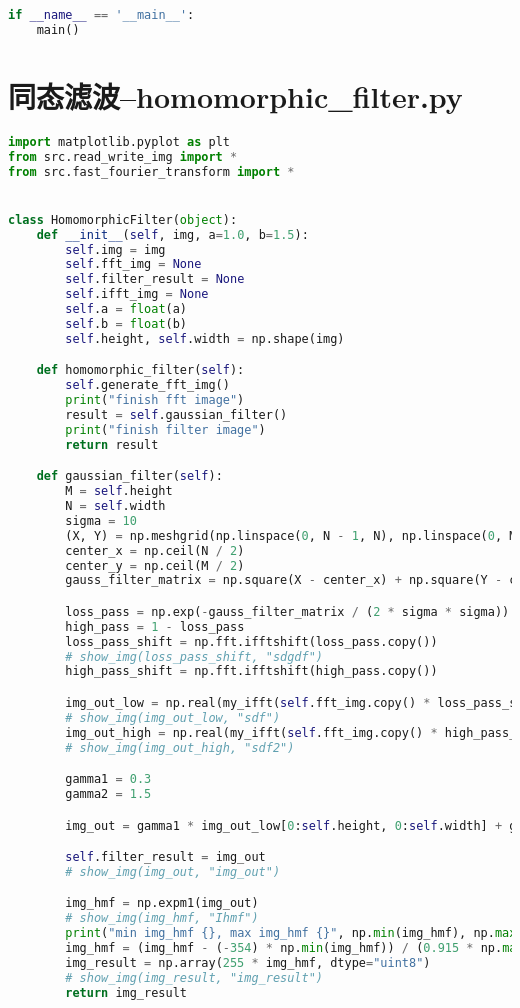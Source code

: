 \documentclass{hitreport}
\begin{document}
\begin{appendices}
\begin{lstlisting}[language=python]
if __name__ == '__main__':
    main()

\end{lstlisting}

\section{同态滤波--homomorphic\_filter.py}\label{app:homo}
\begin{lstlisting}[language=python]
import matplotlib.pyplot as plt
from src.read_write_img import *
from src.fast_fourier_transform import *


class HomomorphicFilter(object):
    def __init__(self, img, a=1.0, b=1.5):
        self.img = img
        self.fft_img = None
        self.filter_result = None
        self.ifft_img = None
        self.a = float(a)
        self.b = float(b)
        self.height, self.width = np.shape(img)

    def homomorphic_filter(self):
        self.generate_fft_img()
        print("finish fft image")
        result = self.gaussian_filter()
        print("finish filter image")
        return result

    def gaussian_filter(self):
        M = self.height
        N = self.width
        sigma = 10
        (X, Y) = np.meshgrid(np.linspace(0, N - 1, N), np.linspace(0, M - 1, M))
        center_x = np.ceil(N / 2)
        center_y = np.ceil(M / 2)
        gauss_filter_matrix = np.square(X - center_x) + np.square(Y - center_y)

        loss_pass = np.exp(-gauss_filter_matrix / (2 * sigma * sigma))
        high_pass = 1 - loss_pass
        loss_pass_shift = np.fft.ifftshift(loss_pass.copy())
        # show_img(loss_pass_shift, "sdgdf")
        high_pass_shift = np.fft.ifftshift(high_pass.copy())

        img_out_low = np.real(my_ifft(self.fft_img.copy() * loss_pass_shift))
        # show_img(img_out_low, "sdf")
        img_out_high = np.real(my_ifft(self.fft_img.copy() * high_pass_shift))
        # show_img(img_out_high, "sdf2")

        gamma1 = 0.3
        gamma2 = 1.5

        img_out = gamma1 * img_out_low[0:self.height, 0:self.width] + gamma2 * img_out_high[0:self.height, 0:self.width]

        self.filter_result = img_out
        # show_img(img_out, "img_out")

        img_hmf = np.expm1(img_out)
        # show_img(img_hmf, "Ihmf")
        print("min img_hmf {}, max img_hmf {}", np.min(img_hmf), np.max(img_hmf))
        img_hmf = (img_hmf - (-354) * np.min(img_hmf)) / (0.915 * np.max(img_hmf) - (-354) * np.min(img_hmf))
        img_result = np.array(255 * img_hmf, dtype="uint8")
        # show_img(img_result, "img_result")
        return img_result


\end{lstlisting}
\end{appendices}
\end{document}
